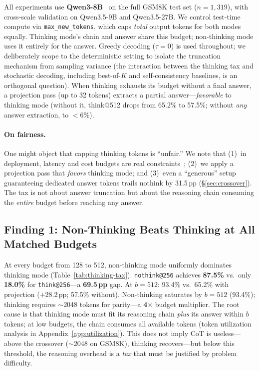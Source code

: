 
All experiments use \textbf{Qwen3-8B}~\cite{qwen3_2025} on the full GSM8K test set ($n{=}1{,}319$), with cross-scale validation on Qwen3.5-9B and Qwen3.5-27B.
We control test-time compute via \texttt{max\_new\_tokens}, which caps \emph{total} output tokens for both modes equally.
Thinking mode's chain and answer share this budget; non-thinking mode uses it entirely for the answer.
Greedy decoding ($\tau{=}0$) is used throughout; we deliberately scope to the deterministic setting to isolate the truncation mechanism from sampling variance (the interaction between the thinking tax and stochastic decoding, including best-of-$K$ and self-consistency baselines, is an orthogonal question).
When thinking exhausts its budget without a final answer, a projection pass (up to 32 tokens) extracts a partial answer---\emph{favorable} to thinking mode (without it, think@512 drops from 65.2\% to 57.5\%; without \emph{any} answer extraction, to ${<}$6\%).

\paragraph{On fairness.}
One might object that capping thinking tokens is ``unfair.''
We note that (1)~in deployment, latency and cost budgets are real constraints~\citep{snell2024scaling}; (2)~we apply a projection pass that \emph{favors} thinking mode; and (3)~even a ``generous'' setup guaranteeing dedicated answer tokens trails nothink by 31.5\,pp (\S\ref{sec:crossover}).
The tax is not about answer truncation but about the reasoning chain consuming the \emph{entire} budget before reaching any answer.

\subsection{Finding 1: Non-Thinking Beats Thinking at All Matched Budgets}
\label{sec:finding:tax}



At every budget from 128 to 512, non-thinking mode uniformly dominates thinking mode (Table~\ref{tab:thinking-tax}).
\texttt{nothink@256} achieves \textbf{87.5\%} vs.\ only \textbf{18.0\%} for \texttt{think@256}---a \textbf{69.5\,pp} gap.
At $b{=}512$: 93.4\% vs.\ 65.2\% with projection ($+28.2$\,pp; 57.5\% without).
Non-thinking saturates by $b{=}512$ (93.4\%); thinking requires ${\sim}$2048 tokens for parity---a \textbf{4$\times$} budget multiplier.
The root cause is that thinking mode must fit its reasoning chain \emph{plus} its answer within $b$ tokens; at low budgets, the chain consumes all available tokens (token utilization analysis in Appendix~\ref{app:utilization}).
This does not imply CoT is useless---above the crossover (${\sim}$2048 on GSM8K), thinking recovers---but below this threshold, the reasoning overhead is a \emph{tax} that must be justified by problem difficulty.

